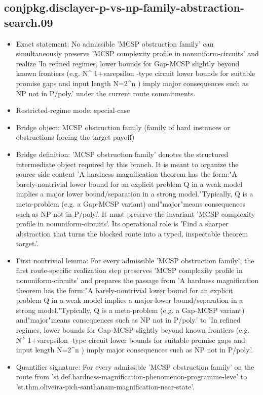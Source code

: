 \documentclass[11pt]{article}
\begin{document}
\subsection*{conjpkg.disclayer-p-vs-np-family-abstraction-search.09}
\begin{itemize}
\item Exact statement: No admissible 'MCSP obstruction family' can simultaneously preserve 'MCSP complexity profile in nonuniform-circuits' and realize 'In refined regimes, lower bounds for Gap-MCSP slightly beyond known frontiers (e.g. N\textasciicircum{} 1+varepsilon -type circuit lower bounds for suitable promise gaps and input length N=2\textasciicircum{}n ) imply major consequences such as NP not in P/poly.' under the current route commitments.
\item Restricted-regime mode: special-case
\item Bridge object: MCSP obstruction family (family of hard instances or obstructions forcing the target payoff)
\item Bridge definition: 'MCSP obstruction family' denotes the structured intermediate object required by this branch. It is meant to organize the source-side content 'A hardness magnification theorem has the form:"A barely-nontrivial lower bound for an explicit problem Q in a weak model implies a major lower bound/separation in a strong model."Typically, Q is a meta-problem (e.g. a Gap-MCSP variant) and"major"means consequences such as NP not in P/poly.'. It must preserve the invariant 'MCSP complexity profile in nonuniform-circuits'. Its operational role is 'Find a sharper abstraction that turns the blocked route into a typed, inspectable theorem target.'.
\item First nontrivial lemma: For every admissible 'MCSP obstruction family', the first route-specific realization step preserves 'MCSP complexity profile in nonuniform-circuits' and prepares the passage from 'A hardness magnification theorem has the form:"A barely-nontrivial lower bound for an explicit problem Q in a weak model implies a major lower bound/separation in a strong model."Typically, Q is a meta-problem (e.g. a Gap-MCSP variant) and"major"means consequences such as NP not in P/poly.' to 'In refined regimes, lower bounds for Gap-MCSP slightly beyond known frontiers (e.g. N\textasciicircum{} 1+varepsilon -type circuit lower bounds for suitable promise gaps and input length N=2\textasciicircum{}n ) imply major consequences such as NP not in P/poly.'.
\item Quantifier signature: For every admissible 'MCSP obstruction family' on the route from 'st.def.hardness-magnification-phenomenon-programme-leve' to 'st.thm.oliveira-pich-santhanam-magnification-near-state'.

\end{itemize}
\end{document}
